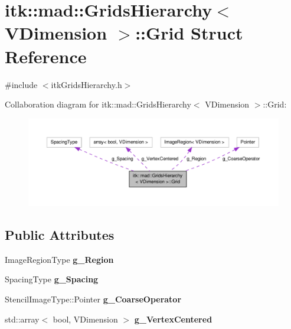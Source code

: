 \hypertarget{structitk_1_1mad_1_1_grids_hierarchy_1_1_grid}{\section{itk\-:\-:mad\-:\-:Grids\-Hierarchy$<$ V\-Dimension $>$\-:\-:Grid Struct Reference}
\label{structitk_1_1mad_1_1_grids_hierarchy_1_1_grid}
}


{\ttfamily \#include $<$itk\-Grids\-Hierarchy.\-h$>$}



Collaboration diagram for itk\-:\-:mad\-:\-:Grids\-Hierarchy$<$ V\-Dimension $>$\-:\-:Grid\-:
\nopagebreak
\begin{figure}[H]
\begin{center}
\leavevmode
\includegraphics[width=350pt]{structitk_1_1mad_1_1_grids_hierarchy_1_1_grid__coll__graph}
\end{center}
\end{figure}
\subsection*{Public Attributes}
\begin{DoxyCompactItemize}
\item 
\hypertarget{structitk_1_1mad_1_1_grids_hierarchy_1_1_grid_a2381941c2ecb243fe329fb9facb7d28d}{Image\-Region\-Type {\bfseries g\-\_\-\-Region}}\label{structitk_1_1mad_1_1_grids_hierarchy_1_1_grid_a2381941c2ecb243fe329fb9facb7d28d}

\item 
\hypertarget{structitk_1_1mad_1_1_grids_hierarchy_1_1_grid_a6357cf20cdb83ffeb73a8bc921be142f}{Spacing\-Type {\bfseries g\-\_\-\-Spacing}}\label{structitk_1_1mad_1_1_grids_hierarchy_1_1_grid_a6357cf20cdb83ffeb73a8bc921be142f}

\item 
\hypertarget{structitk_1_1mad_1_1_grids_hierarchy_1_1_grid_a35fe66e43347ef491ac7a41e64841bcb}{Stencil\-Image\-Type\-::\-Pointer {\bfseries g\-\_\-\-Coarse\-Operator}}\label{structitk_1_1mad_1_1_grids_hierarchy_1_1_grid_a35fe66e43347ef491ac7a41e64841bcb}

\item 
\hypertarget{structitk_1_1mad_1_1_grids_hierarchy_1_1_grid_ae0d5743811e1b5a941522f3b364b2c3a}{std\-::array$<$ bool, V\-Dimension $>$ {\bfseries g\-\_\-\-Vertex\-Centered}}\label{structitk_1_1mad_1_1_grids_hierarchy_1_1_grid_ae0d5743811e1b5a941522f3b364b2c3a}

\end{DoxyCompactItemize}


